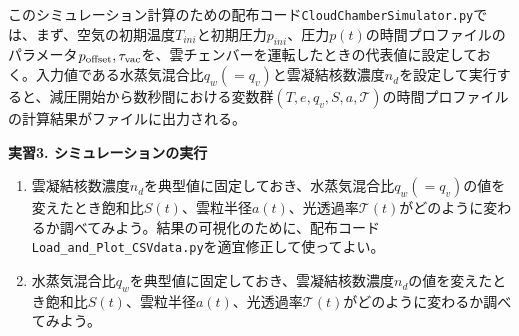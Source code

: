 \documentclass{ltjsarticle}
\begin{document}
このシミュレーション計算のための配布コード\verb|CloudChamberSimulator.py|では、まず、空気の初期温度$T_{ini}$と初期圧力$p_{ini}$、圧力$p(t)$の時間プロファイルのパラメータ$p_{\rm offset}, \tau_{\rm vac}$を、雲チェンバーを運転したときの代表値に設定しておく。入力値である水蒸気混合比$q_{w}(=q_{v})$と雲凝結核数濃度$n_{d}$を設定して実行すると、減圧開始から数秒間における変数群$(T,e,q_{v},S,a,\mathcal{T})$の時間プロファイルの計算結果がファイルに出力される。
\\
\begin{itembox}[l]{\bf{実習3. シミュレーションの実行}}
\begin{enumerate}
\item 雲凝結核数濃度$n_{d}$を典型値に固定しておき、水蒸気混合比$q_{w}(=q_{v})$の値を変えたとき飽和比$S(t)$、雲粒半径$a(t)$、光透過率$\mathcal{T}(t)$がどのように変わるか調べてみよう。結果の可視化のために、配布コード\verb|Load_and_Plot_CSVdata.py|を適宜修正して使ってよい。
\item 水蒸気混合比$q_{w}$を典型値に固定しておき、雲凝結核数濃度$n_{d}$の値を変えたとき飽和比$S(t)$、雲粒半径$a(t)$、光透過率$\mathcal{T}(t)$がどのように変わるか調べてみよう。
\end{enumerate}
\end{itembox}
\end{document}
